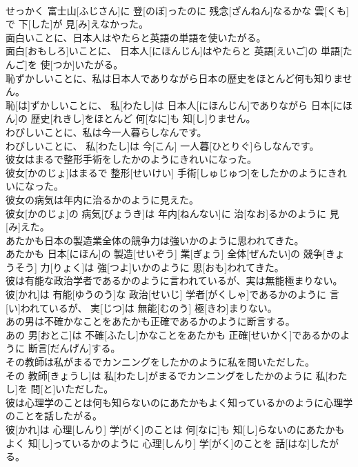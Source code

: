 \documentclass[8pt]{extreport}
\begin{document}
\begin{CJK}{UTF8}{min}
\\	せっかく 富士山[ふじさん]に 登[のぼ]ったのに 残念[ざんねん]なるかな 雲[くも]で 下[した]が 見[み]えなかった。
\\	面白いことに、日本人はやたらと英語の単語を使いたがる。	
\\	面白[おもしろ]いことに、 日本人[にほんじん]はやたらと 英語[えいご]の 単語[たんご]を 使[つか]いたがる。
\\	恥ずかしいことに、私は日本人でありながら日本の歴史をほとんど何も知りません。	
\\	恥[は]ずかしいことに、 私[わたし]は 日本人[にほんじん]でありながら 日本[にほん]の 歴史[れきし]をほとんど 何[なに]も 知[し]りません。
\\	わびしいことに、私は今一人暮らしなんです。	
\\	わびしいことに、 私[わたし]は 今[こん] 一人暮[ひとりぐ]らしなんです。
\\	彼女はまるで整形手術をしたかのようにきれいになった。	
\\	彼女[かのじょ]はまるで 整形[せいけい] 手術[しゅじゅつ]をしたかのようにきれいになった。
\\	彼女の病気は年内に治るかのように見えた。	
\\	彼女[かのじょ]の 病気[びょうき]は 年内[ねんない]に 治[なお]るかのように 見[み]えた。
\\	あたかも日本の製造業全体の競争力は強いかのように思われてきた。	
\\	あたかも 日本[にほん]の 製造[せいぞう] 業[ぎょう] 全体[ぜんたい]の 競争[きょうそう] 力[りょく]は 強[つよ]いかのように 思[おも]われてきた。
\\	彼は有能な政治学者であるかのように言われているが、実は無能極まりない。	
\\	彼[かれ]は 有能[ゆうのう]な 政治[せいじ] 学者[がくしゃ]であるかのように 言[い]われているが、 実[じつ]は 無能[むのう] 極[きわ]まりない。
\\	あの男は不確かなことをあたかも正確であるかのように断言する。	
\\	あの 男[おとこ]は 不確[ふたし]かなことをあたかも 正確[せいかく]であるかのように 断言[だんげん]する。
\\	その教師は私がまるでカンニングをしたかのように私を問いただした。	
\\	その 教師[きょうし]は 私[わたし]がまるでカンニングをしたかのように 私[わたし]を 問[と]いただした。
\\	彼は心理学のことは何も知らないのにあたかもよく知っているかのように心理学のことを話したがる。	
\\	彼[かれ]は 心理[しんり] 学[がく]のことは 何[なに]も 知[し]らないのにあたかもよく 知[し]っているかのように 心理[しんり] 学[がく]のことを 話[はな]したがる。

\end{CJK}
\end{document}
